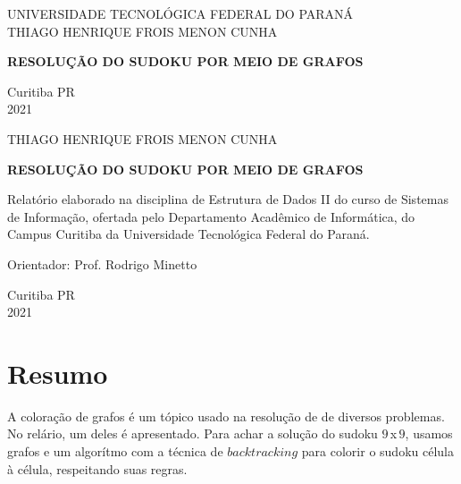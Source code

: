 \documentclass[12pt,a4paper]{article}
\begin{document}
	\begin{titlepage}
		\begin{center} 
			{\large UNIVERSIDADE TECNOLÓGICA FEDERAL DO PARANÁ}\\[0.7cm]
			{\large THIAGO HENRIQUE FROIS MENON CUNHA}
			\vspace*{\fill}
			
			{\bf \large RESOLUÇÃO DO SUDOKU POR MEIO DE GRAFOS}
			\vspace*{\fill}
			
			{\large Curitiba PR}\\[0.7cm]
			{\large 2021}
		\end{center}
	\end{titlepage}
	\begin{titlepage}
		\begin{center} 
			{\large THIAGO HENRIQUE FROIS MENON CUNHA}
			\vspace*{\fill}
			
			{\bf \large RESOLUÇÃO DO SUDOKU POR MEIO DE GRAFOS}\\[0.7cm]
			\hspace{.45\textwidth}
			\begin{minipage}{.5\textwidth}
				Relatório elaborado na disciplina de Estrutura de Dados II do curso de Sistemas de Informação, ofertada pelo Departamento Acadêmico de Informática, do Campus Curitiba da Universidade Tecnológica Federal do Paraná.
				
				Orientador: Prof. Rodrigo Minetto
			\end{minipage}
		
			\vspace*{\fill}
			
			{\large Curitiba PR}\\[0.7cm]
			{\large 2021}
		\end{center} 
	\end{titlepage}
	\par
	\section*{Resumo}
	A coloração de grafos é um tópico usado na resolução de de diversos problemas. No relário, um deles é apresentado. Para achar a solução do sudoku $9$\,x\,$9$, usamos grafos e um algorítmo com a técnica de $backtracking$ para colorir o sudoku célula à célula, respeitando suas regras. 
	
	\pagebreak
	
	\tableofcontents
	\pagebreak
	
\end{document}
